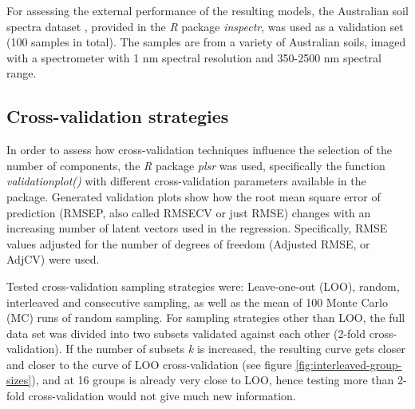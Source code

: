 \documentclass{isprs}
\begin{document}
For assessing the external performance of the resulting models, the Australian soil spectra dataset \cite{rossel2010using}, provided in the \textit{R} package \textit{inspectr}, was used as a validation set (100 samples in total). The samples are from a variety of Australian soils, imaged with a spectrometer with 1 nm spectral resolution and 350-2500 nm spectral range.

\subsection{Cross-validation strategies}\label{sec:Cross-validation strategies}

In order to assess how cross-validation techniques influence the selection of the number of components, the \textit{R} package \textit{plsr} was used, specifically the function \textit{validationplot()} with different cross-validation parameters available in the package. Generated validation plots show how the root mean square error of prediction (RMSEP, also called RMSECV or just RMSE) changes with an increasing number of latent vectors used in the regression. Specifically, RMSE values adjusted for the number of degrees of freedom (Adjusted RMSE, or AdjCV) were used.

Tested cross-validation sampling strategies were: Leave-one-out (LOO), random, interleaved and consecutive sampling, as well as the mean of 100 Monte Carlo (MC) runs of random sampling. For sampling strategies other than LOO, the full data set was divided into two subsets validated against each other (2-fold cross-validation). If the number of subsets \textit{k} is increased, the resulting curve gets closer and closer to the curve of LOO cross-validation (see figure \ref{fig:interleaved-group-sizes}), and at 16 groups is already very close to LOO, hence testing more than 2-fold cross-validation would not give much new information.
\end{document}
